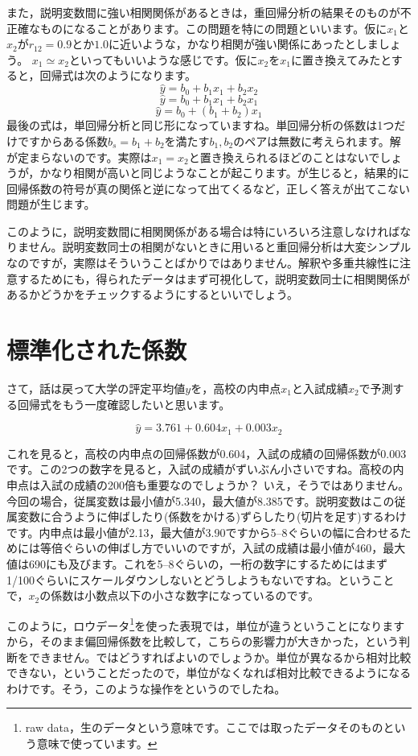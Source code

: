 \documentclass{ltjbook}
\begin{document}
また，説明変数間に強い相関関係があるときは，重回帰分析の結果そのものが不正確なものになることがあります。この問題を特にの問題といいます。仮に$x_1$と$x_2$が$r_{12}=0.9$とか$1.0$に近いような，かなり相関が強い関係にあったとしましょう。
$x_1 \simeq x_2$といってもいいような感じです。仮に$x_2$を$x_1$に置き換えてみたとすると，回帰式は次のようになります。
\[ \hat{y} = b_0 + b_1 x_1 + b_2x_2 \]
\[ \hat{y} = b_0 + b_1 x_1 + b_2x_1 \]
\[ \hat{y} = b_0 + (b_1+b_2) x_1 \]
最後の式は，単回帰分析と同じ形になっていますね。単回帰分析の係数は1つだけですからある係数$b_s = b_1 + b_2$を満たす$b_1,b_2$のペアは無数に考えられます。解が定まらないのです。実際は$x_1=x_2$と置き換えられるほどのことはないでしょうが，かなり相関が高いと同じようなことが起こります。が生じると，結果的に回帰係数の符号が真の関係と逆になって出てくるなど，正しく答えが出てこない問題が生じます。

このように，説明変数間に相関関係がある場合は特にいろいろ注意しなければなりません。説明変数同士の相関がないときに用いると重回帰分析は大変シンプルなのですが，実際はそういうことばかりではありません。解釈や多重共線性に注意するためにも，得られたデータはまず可視化して，説明変数同士に相関関係があるかどうかをチェックするようにするといいでしょう。


\section{標準化された係数}

さて，話は戻って大学の評定平均値$y$を，高校の内申点$x_1$と入試成績$x_2$で予測する回帰式をもう一度確認したいと思います。

\[ \hat{y} = 3.761+0.604x_1+0.003x_2 \]

これを見ると，高校の内申点の回帰係数が0.604，入試の成績の回帰係数が0.003です。この2つの数字を見ると，入試の成績がずいぶん小さいですね。高校の内申点は入試の成績の200倍も重要なのでしょうか？ いえ，そうではありません。今回の場合，従属変数は最小値が5.340，最大値が8.385です。説明変数はこの従属変数に合うように伸ばしたり(係数をかける)ずらしたり(切片を足す)するわけです。内申点は最小値が2.13，最大値が3.90ですから5--8ぐらいの幅に合わせるためには等倍ぐらいの伸ばし方でいいのですが，入試の成績は最小値が460，最大値は690にも及びます。これを5--8ぐらいの，一桁の数字にするためにはまず1/100ぐらいにスケールダウンしないとどうしようもないですね。ということで，$x_2$の係数は小数点以下の小さな数字になっているのです。

このように，ロウデータ\footnote{raw data，生のデータという意味です。ここでは取ったデータそのものという意味で使っています。}を使った表現では，単位が違うということになりますから，そのまま偏回帰係数を比較して，こちらの影響力が大きかった，という判断をできません。ではどうすればよいのでしょうか。単位が異なるから相対比較できない，ということだったので，単位がなくなれば相対比較できるようになるわけです。そう，このような操作をというのでしたね。
\end{document}
